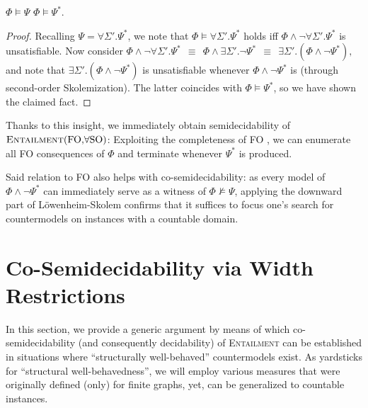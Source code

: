\begin{observation}
$\Phi \models \Psi$ \iffi $\Phi \models \Psi^*$.
\end{observation}
\begin{proof}
Recalling $\Psi = \forall\Sigma'.\Psi^*$, we note that $\Phi \models \forall\Sigma'.\Psi^*$ holds iff $\Phi \wedge  \neg \forall\Sigma'.\Psi^*$ is unsatisfiable. Now consider
$\Phi \wedge  \neg \forall\Sigma'.\Psi^* \ \ \equiv \ \ \Phi \wedge  \exists\Sigma'.\neg\Psi^* \ \ \equiv \ \ \exists\Sigma'.(\Phi \wedge  \neg\Psi^*),$
and note that $\exists\Sigma'.(\Phi \wedge  \neg\Psi^*)$ is unsatisfiable whenever $\Phi \wedge  \neg\Psi^*$ is (through second-order Skolemization). 
The latter coincides with $\Phi \models \Psi^*$, so we have shown the claimed fact.
\end{proof}

Thanks to this insight, we immediately obtain semidecidability of $\textsc{Entailment}(\mathrm{FO},\!\forall\mathrm{SO})$: Exploiting the completeness of FO \cite{God29FOLcomp}, we can enumerate all FO consequences of $\Phi$ and terminate whenever $\Psi^*$ is produced. 

Said relation to FO also helps with co-semidecidability: as every model of $\Phi \wedge \neg\Psi^*$ can immediately serve as a witness of $\Phi \not\models \Psi$, applying the downward part of Löwenheim-Skolem \cite{LSTheorem} confirms that it suffices to focus one's search for countermodels on instances with a countable domain.


\section{Co-Semidecidability via Width Restrictions}\label{sec:genericdecidability}

In this section, we provide a generic argument by means of which co-semidecidability (and consequently decidability) of \textsc{Entailment} can be established in situations where ``structurally well-behaved'' countermodels exist.  
As yardsticks for ``structural well-behavedness'', we will employ various measures that were originally defined (only) for finite graphs, yet, can be generalized to countable instances.  

